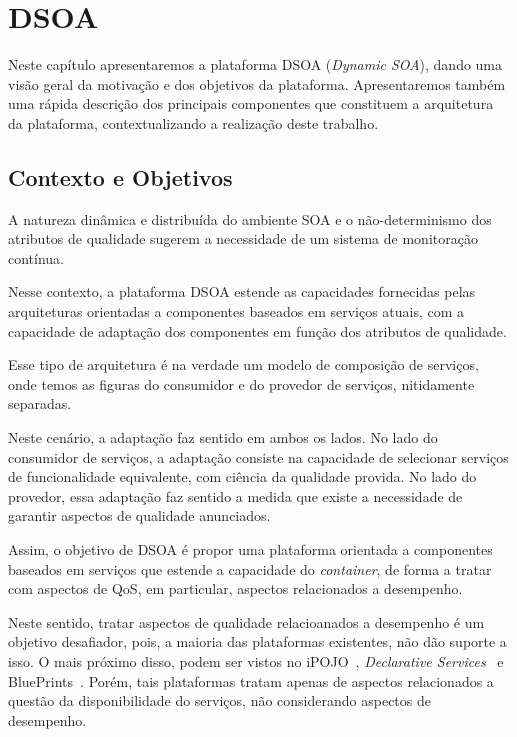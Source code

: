 \chapter{DSOA}
\label{ch:3}
Neste capítulo apresentaremos a plataforma DSOA (\textit{Dynamic SOA}), dando uma visão geral da motivação e dos objetivos da plataforma. Apresentaremos também uma rápida descrição dos principais componentes que constituem a arquitetura da plataforma, contextualizando a realização deste trabalho.

\section{Contexto e Objetivos}
\label{sec:dsoa_intro}

A natureza dinâmica e distribuída do ambiente SOA e o não-determinismo dos atributos de qualidade sugerem a necessidade de um sistema de monitoração contínua.

Nesse contexto, a plataforma DSOA estende as capacidades fornecidas pelas arquiteturas orientadas a componentes baseados em serviços atuais, com a capacidade de adaptação dos componentes em função dos atributos de qualidade. 

Esse tipo de arquitetura é na verdade um modelo de composição de serviços, onde temos as figuras do consumidor e do provedor de serviços, nitidamente separadas.

Neste cenário, a adaptação faz sentido em ambos os lados. No lado do consumidor de serviços, a adaptação consiste na capacidade de selecionar serviços de funcionalidade equivalente, com ciência da qualidade provida. No lado do provedor, essa adaptação faz sentido a medida que existe a necessidade de garantir aspectos de qualidade anunciados.

Assim, o objetivo de DSOA é propor uma plataforma orientada a componentes baseados em serviços que estende a capacidade do \textit{container}, de forma a tratar com aspectos de QoS, em particular, aspectos relacionados a desempenho.

Neste sentido, tratar aspectos de qualidade relacioanados a desempenho é um objetivo desafiador, pois, a maioria das plataformas existentes, não dão suporte a isso. O mais próximo disso, podem ser vistos no iPOJO~\cite{ipojo}, \textit{Declarative Services}~\cite{declarative} e BluePrints~\cite{blueprint}. Porém, tais plataformas tratam apenas de aspectos relacionados a questão da disponibilidade do serviços, não considerando aspectos de desempenho.

